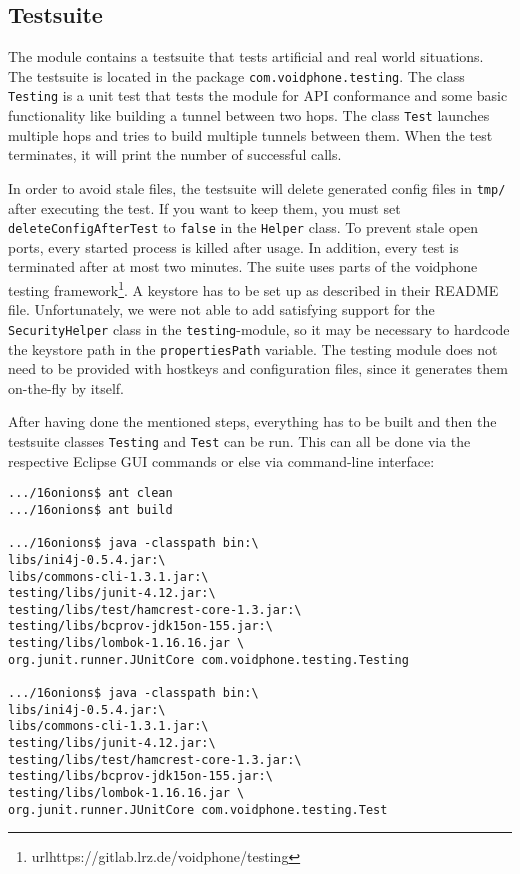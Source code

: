 \documentclass{article}
\begin{document}
\subsection{Testsuite}
The module contains a testsuite that tests artificial and real world situations. The testsuite is
located in the package \texttt{com.voidphone.testing}. The class \texttt{Testing} is a unit test
that tests the module for API conformance and some basic functionality like building a tunnel
between two hops. The class \texttt{Test} launches multiple hops and tries to build multiple
tunnels between them. When the test terminates, it will print the number of successful calls.

In order to avoid stale files, the testsuite will delete generated config files in \texttt{tmp/}
after executing the test. If you want to keep them, you must set \texttt{deleteConfigAfterTest}
to \texttt{false} in the \texttt{Helper} class. To prevent stale open ports, every started process
is killed after usage. In addition, every test is terminated after at most two minutes.
The suite uses parts of the voidphone testing framework\footnote{url{https://gitlab.lrz.de/voidphone/testing}}. A keystore has to be set up as described in their README file. Unfortunately, we were not able to add satisfying support for the \texttt{SecurityHelper} class in
the \texttt{testing}-module, so it may be necessary to hardcode the keystore path in the
\texttt{propertiesPath} variable.
The testing module does not need to be provided with hostkeys and configuration files, since it generates them on-the-fly by itself.

After having done the mentioned steps, everything has to be built and then the testsuite classes \texttt{Testing} and  \texttt{Test} can be run. This can all be done via the respective Eclipse GUI commands or else via command-line interface:

\begin{lstlisting}
.../16onions$ ant clean
.../16onions$ ant build

.../16onions$ java -classpath bin:\
libs/ini4j-0.5.4.jar:\
libs/commons-cli-1.3.1.jar:\
testing/libs/junit-4.12.jar:\
testing/libs/test/hamcrest-core-1.3.jar:\
testing/libs/bcprov-jdk15on-155.jar:\
testing/libs/lombok-1.16.16.jar \
org.junit.runner.JUnitCore com.voidphone.testing.Testing

.../16onions$ java -classpath bin:\
libs/ini4j-0.5.4.jar:\
libs/commons-cli-1.3.1.jar:\
testing/libs/junit-4.12.jar:\
testing/libs/test/hamcrest-core-1.3.jar:\
testing/libs/bcprov-jdk15on-155.jar:\
testing/libs/lombok-1.16.16.jar \
org.junit.runner.JUnitCore com.voidphone.testing.Test
\end{lstlisting}
\end{document}
